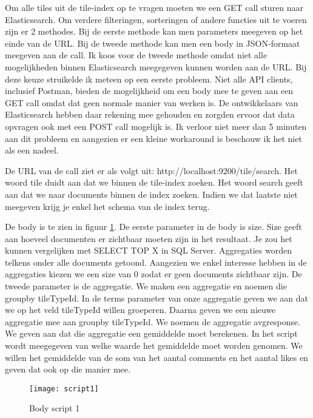Om alle tiles uit de tile-index op te vragen moeten we een GET call sturen naar Elasticsearch. Om verdere filteringen, sorteringen of andere functies uit te voeren zijn er 2 methodes. Bij de eerste methode kan men parameters meegeven op het einde van de URL. Bij de tweede methode kan men een body in JSON-formaat meegeven aan de call. Ik koos voor de tweede methode omdat niet alle mogelijkheden binnen Elasticsearch meegegeven kunnen worden aan de URL. Bij deze keuze struikelde ik meteen op een eerste probleem. Niet alle API clients, inclusief Postman, bieden de mogelijkheid om een body mee te geven aan een GET call omdat dat geen normale manier van werken is. De ontwikkelaars van Elasticsearch hebben daar rekening mee gehouden en zorgden ervoor dat data opvragen ook met een POST call mogelijk is. Ik verloor niet meer dan 5 minuten aan dit probleem en aangezien er een kleine workaround is beschouw ik het niet als een nadeel.

De URL van de call ziet er als volgt uit: http://localhost:9200/tile/\textunderscore search. Het woord tile duidt aan dat we binnen de tile-index zoeken. Het woord \textunderscore search geeft aan dat we naar documents binnen de index zoeken. Indien we dat laatste niet meegeven krijg je enkel het schema van de index terug.

De body is te zien in figuur \ref{fig:script1}. De eerste parameter in de body is size. Size geeft aan hoeveel documenten er zichtbaar moeten zijn in het resultaat. Je zou het kunnen vergelijken met SELECT TOP X in SQL Server. Aggregaties worden telkens onder alle documents getoond. Aangezien we enkel interesse hebben in de aggregaties kiezen we een size van 0 zodat er geen documents zichtbaar zijn. De tweede parameter is de aggregatie. We maken een aggregatie en noemen die group\textunderscore by \textunderscore tileTypeId. In de terms parameter van onze aggregatie geven we aan dat we op het veld tileTypeId willen groeperen. Daarna geven we een nieuwe aggregatie mee aan group\textunderscore by \textunderscore tileTypeId. We noemen de aggregatie avg\textunderscore response. We geven aan dat die aggregatie een gemiddelde moet berekenen. In het script wordt meegegeven van welke waarde het gemiddelde moet worden genomen. We willen het gemiddelde van de som van het aantal comments en het aantal likes en geven dat ook op die manier mee.

\begin{figure}
	\centering
	\texttt{[image: script1]}
	\caption{Body script 1}
	\label{fig:script1}
\end{figure}

